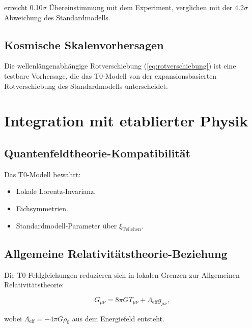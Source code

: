 \documentclass[12pt,a4paper]{report}
\newcommand{\xiparticle}{\xi_{\text{Teilchen}}}
\theoremstyle{definition}
\begin{document}
	erreicht 0.10$\sigma$ Übereinstimmung mit dem Experiment, verglichen mit der 4.2$\sigma$ Abweichung des Standardmodells.
	
	\section{Kosmische Skalenvorhersagen}
	\label{sec:kosmische_vorhersagen}
	
	Die wellenlängenabhängige Rotverschiebung (\cref{eq:rotverschiebung}) ist eine testbare Vorhersage, die das T0-Modell von der expansionsbasierten Rotverschiebung des Standardmodells unterscheidet.
	
	\chapter{Integration mit etablierter Physik}
	\label{chap:integration}
	
	\section{Quantenfeldtheorie-Kompatibilität}
	\label{sec:qft_kompatibilitaet}
	
	Das T0-Modell bewahrt:
	
	\begin{itemize}
		\item Lokale Lorentz-Invarianz.
		\item Eichsymmetrien.
		\item Standardmodell-Parameter über $\xiparticle$.
	\end{itemize}
	
	\section{Allgemeine Relativitätstheorie-Beziehung}
	\label{sec:art_beziehung}
	
	Die T0-Feldgleichungen reduzieren sich in lokalen Grenzen zur Allgemeinen Relativitätstheorie:
	
	\begin{equation}
		G_{\mu\nu} = 8\pi G T_{\mu\nu} + \Lambda_{\text{eff}} g_{\mu\nu},
		\label{eq:art_beziehung}
	\end{equation}
	
	wobei $\Lambda_{\text{eff}} = -4\pi G \rho_0$ aus dem Energiefeld entsteht.
	
\end{document}
